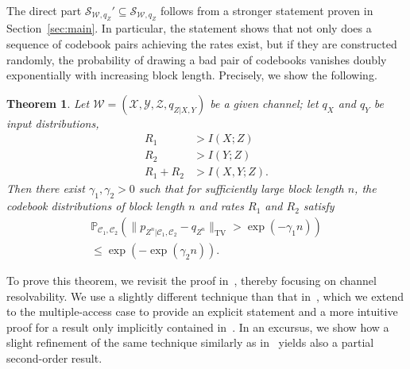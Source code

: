 \documentclass[journal]{IEEEtran}
\newcommand{\channelpmf}{q}
\newcommand{\codebookpmf}{p}
\newcommand{\codebookRateOne}{R_1}
\newcommand{\codebookRateTwo}{R_2}
\newcommand{\channelInOne}{X}
\newcommand{\channelInOneAlph}{\mathcal{X}}
\newcommand{\channelInTwo}{Y}
\newcommand{\channelInTwoAlph}{\mathcal{Y}}
\newcommand{\channelOut}{Z}
\newcommand{\channelOutAlph}{\mathcal{Z}}
\newcommand{\channel}{\mathcal{W}}
\newcommand{\codebookOne}{\mathcal{C}_1}
\newcommand{\codebookTwo}{\mathcal{C}_2}
\newcommand{\codebookBlocklength}{n}
\newcommand{\mutualInformation}[2]{I(#1;#2)}
\newcommand{\finalconstOne}{\gamma_1}
\newcommand{\finalconstTwo}{\gamma_2}
\newcommand{\totalvariation}[1]{\lVert #1 \rVert_\mathrm{TV}}
\newcommand{\Probability}{\mathbb{P}}
\newcommand{\capacityRegion}[2]{\mathcal{S}_{#1, #2}}
\newtheorem{theorem}{Theorem}
\begin{document}
The direct part
$\capacityRegion{\channel}{\channelpmf_\channelOut}' \subseteq
\capacityRegion{\channel}{\channelpmf_\channelOut}$ follows from a
stronger statement proven in Section~\ref{sec:main}. In particular,
the statement shows that not only does a sequence of codebook pairs
achieving the rates exist, but if they are constructed randomly, the
probability of drawing a bad pair of codebooks vanishes doubly
exponentially with increasing block length. Precisely, we show the
following. 

\begin{theorem}
\label{theorem:soft-covering-two-transmitters-convex}
Let
$\channel = (\channelInOneAlph, \channelInTwoAlph, \channelOutAlph,
\channelpmf_{\channelOut | \channelInOne, \channelInTwo})$ be a given
channel; let $\channelpmf_\channelInOne$ and $\channelpmf_\channelInTwo$
be input distributions,
\begin{align}
\label{theorem:soft-covering-two-transmitters-convex-rateone}
\codebookRateOne &> \mutualInformation{\channelInOne}{\channelOut}
\\
\label{theorem:soft-covering-two-transmitters-convex-ratetwo}
\codebookRateTwo &> \mutualInformation{\channelInTwo}{\channelOut}
\\
\label{theorem:soft-covering-two-transmitters-convex-sumrates}
\codebookRateOne + \codebookRateTwo &> \mutualInformation{\channelInOne, \channelInTwo}{\channelOut}.
\end{align}
Then there exist $\finalconstOne, \finalconstTwo > 0$ such that for
sufficiently large block length $\codebookBlocklength$, the codebook
distributions of block length $\codebookBlocklength$ and rates
$\codebookRateOne$ and $\codebookRateTwo$ satisfy
\begin{multline*}
\Probability_{\codebookOne, \codebookTwo} \left(
  \totalvariation{
    \codebookpmf_{\channelOut^\codebookBlocklength | \codebookOne, \codebookTwo} - \channelpmf_{\channelOut^\codebookBlocklength}
  }
  >
  \exp(-\finalconstOne\codebookBlocklength)
\right)
\\
\leq
\exp\left(-\exp\left(\finalconstTwo\codebookBlocklength\right)\right).
\end{multline*}
\end{theorem}

To prove this theorem, we revisit the proof in~\cite{WieseWiretap},
thereby focusing on channel resolvability. We use a slightly different
technique than that in~\cite{CuffSoftCovering}, which we extend to the
multiple-access case to provide an explicit statement and a more
intuitive proof for a result only implicitly contained
in~\cite{WieseWiretap}. In an excursus, we show how a slight
refinement of the same technique similarly as
in~\cite{CuffSoftCovering} yields also a partial second-order result.
\end{document}
